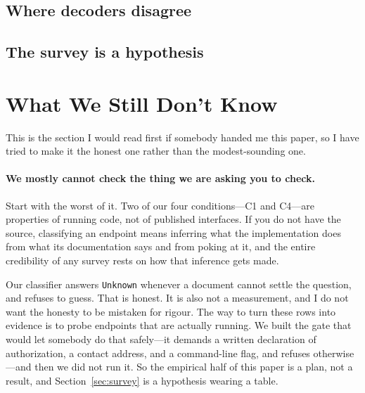 \documentclass[11pt]{article}
\begin{document}
\subsection{Where decoders disagree}

\begin{center}

\end{center}

\subsection{The survey is a hypothesis}


\section{What We Still Don't Know}
\label{sec:openwork}

This is the section I would read first if somebody handed me this paper, so I
have tried to make it the honest one rather than the modest-sounding one.

\paragraph{We mostly cannot check the thing we are asking you to check.}
Start with the worst of it. Two of our four conditions---C1 and C4---are
properties of running code, not of published interfaces. If you do not have
the source, classifying an endpoint means inferring what the implementation
does from what its documentation says and from poking at it, and the entire
credibility of any survey rests on how that inference gets made.

Our classifier answers \texttt{Unknown} whenever a document cannot settle the
question, and refuses to guess. That is honest. It is also not a measurement,
and I do not want the honesty to be mistaken for rigour. The way to turn these
rows into evidence is to probe endpoints that are actually running. We built
the gate that would let somebody do that safely---it demands a written
declaration of authorization, a contact address, and a command-line flag, and
refuses otherwise---and then we did not run it. So the empirical half of this
paper is a plan, not a result, and Section~\ref{sec:survey} is a hypothesis
wearing a table.
\end{document}
